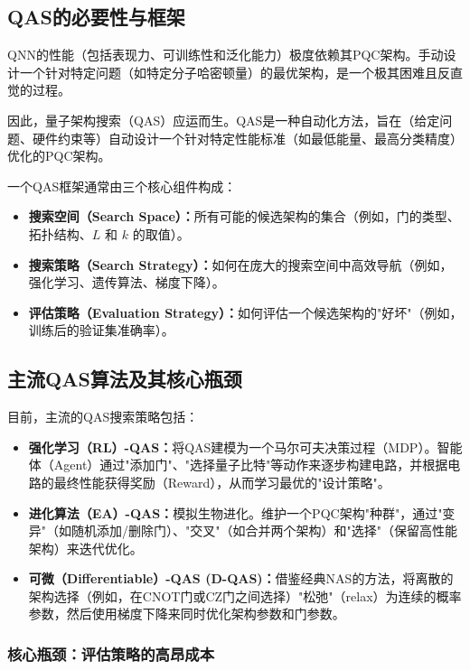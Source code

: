 \documentclass[12pt,a4paper]{article}
\begin{document}
\subsection{QAS的必要性与框架}

QNN的性能（包括表现力、可训练性和泛化能力）极度依赖其PQC架构。手动设计一个针对特定问题（如特定分子哈密顿量）的最优架构，是一个极其困难且反直觉的过程。

因此，量子架构搜索（QAS）应运而生。QAS是一种自动化方法，旨在（给定问题、硬件约束等）自动设计一个针对特定性能标准（如最低能量、最高分类精度）优化的PQC架构。

一个QAS框架通常由三个核心组件构成：
\begin{itemize}
\item \textbf{搜索空间（Search Space）：}所有可能的候选架构的集合（例如，门的类型、拓扑结构、$L$ 和 $k$ 的取值）。
\item \textbf{搜索策略（Search Strategy）：}如何在庞大的搜索空间中高效导航（例如，强化学习、遗传算法、梯度下降）。
\item \textbf{评估策略（Evaluation Strategy）：}如何评估一个候选架构的"好坏"（例如，训练后的验证集准确率）。
\end{itemize}

\subsection{主流QAS算法及其核心瓶颈}

目前，主流的QAS搜索策略包括：

\begin{itemize}
\item \textbf{强化学习（RL）-QAS：}将QAS建模为一个马尔可夫决策过程（MDP）。智能体（Agent）通过"添加门"、"选择量子比特"等动作来逐步构建电路，并根据电路的最终性能获得奖励（Reward），从而学习最优的"设计策略"。

\item \textbf{进化算法（EA）-QAS：}模拟生物进化。维护一个PQC架构"种群"，通过"变异"（如随机添加/删除门）、"交叉"（如合并两个架构）和"选择"（保留高性能架构）来迭代优化。

\item \textbf{可微（Differentiable）-QAS (D-QAS)：}借鉴经典NAS的方法，将离散的架构选择（例如，在CNOT门或CZ门之间选择）"松弛"（relax）为连续的概率参数，然后使用梯度下降来同时优化架构参数和门参数。
\end{itemize}

\subsubsection{核心瓶颈：评估策略的高昂成本}
\end{document}
